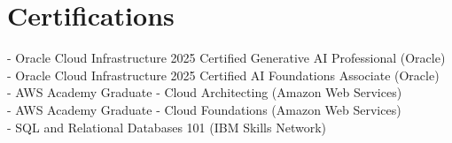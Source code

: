 \documentclass[letterpaper,10pt]{article}
\begin{document}
\section{Certifications}
\begin{itemize}[leftmargin=0.15in, label={}]
    \small{\item{
      - Oracle Cloud Infrastructure 2025 Certified Generative AI Professional (Oracle)\\
      - Oracle Cloud Infrastructure 2025 Certified AI Foundations Associate (Oracle)\\
      - AWS Academy Graduate - Cloud Architecting (Amazon Web Services)\\
      - AWS Academy Graduate - Cloud Foundations (Amazon Web Services)\\
      - SQL and Relational Databases 101 (IBM Skills Network)\\
    }}
\end{itemize}
\end{document}
